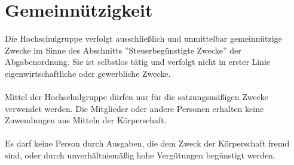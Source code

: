 \documentclass[11pt]{article}
\begin{document}
	\section{Gemeinnützigkeit}
	Die Hochschulgruppe verfolgt ausschließlich und unmittelbar gemeinnützige Zwecke im Sinne
	des Abschnitts ''Steuerbegünstigte Zwecke'' der Abgabenordnung. Sie ist selbstlos tätig und verfolgt
	nicht in erster Linie eigenwirtschaftliche oder gewerbliche Zwecke.\\\\
	Mittel der Hochschulgruppe dürfen nur für die satzungsmäßigen Zwecke verwendet werden. Die
	Mitglieder oder andere Personen erhalten keine Zuwendungen aus Mitteln der Körperschaft.\\\\
	Es darf keine Person durch Ausgaben, die dem Zweck der Körperschaft fremd sind, oder durch
	unverhältnismäßig hohe Vergütungen begünstigt werden.
\end{document}
